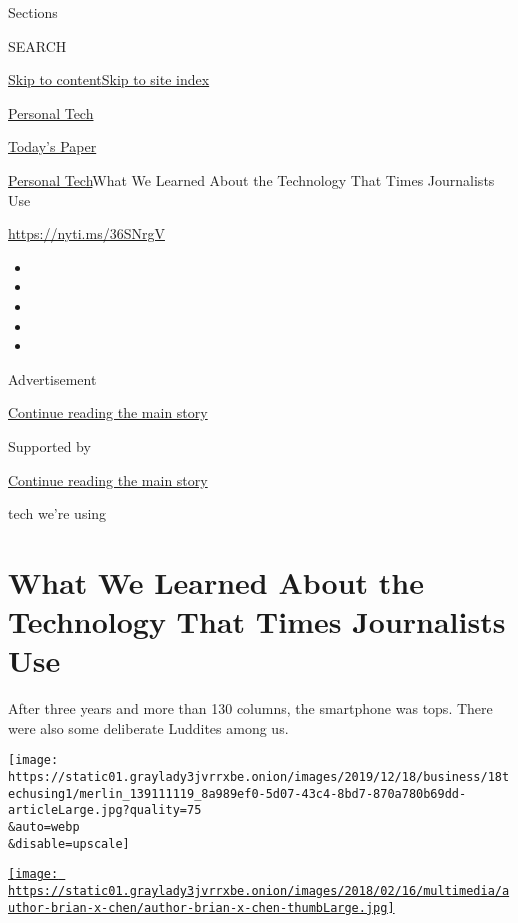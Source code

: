 Sections

SEARCH

\protect\hyperlink{site-content}{Skip to
content}\protect\hyperlink{site-index}{Skip to site index}

\href{https://www.nytimes3xbfgragh.onion/section/technology/personaltech}{Personal
Tech}

\href{https://myaccount.nytimes3xbfgragh.onion/auth/login?response_type=cookie\&client_id=vi}{}

\href{https://www.nytimes3xbfgragh.onion/section/todayspaper}{Today's
Paper}

\href{/section/technology/personaltech}{Personal Tech}\textbar{}What We
Learned About the Technology That Times Journalists Use

\url{https://nyti.ms/36SNrgV}

\begin{itemize}
\item
\item
\item
\item
\item
\end{itemize}

Advertisement

\protect\hyperlink{after-top}{Continue reading the main story}

Supported by

\protect\hyperlink{after-sponsor}{Continue reading the main story}

tech we're using

\hypertarget{what-we-learned-about-the-technology-that-times-journalists-use}{%
\section{What We Learned About the Technology That Times Journalists
Use}\label{what-we-learned-about-the-technology-that-times-journalists-use}}

After three years and more than 130 columns, the smartphone was tops.
There were also some deliberate Luddites among us.

\texttt{[image: https://static01.graylady3jvrrxbe.onion/images/2019/12/18/business/18techusing1/merlin\_139111119\_8a989ef0-5d07-43c4-8bd7-870a780b69dd-articleLarge.jpg?quality=75\\\&auto=webp\\\&disable=upscale]}

\href{https://www.nytimes3xbfgragh.onion/by/brian-x-chen}{\texttt{[image: https://static01.graylady3jvrrxbe.onion/images/2018/02/16/multimedia/author-brian-x-chen/author-brian-x-chen-thumbLarge.jpg]}}

